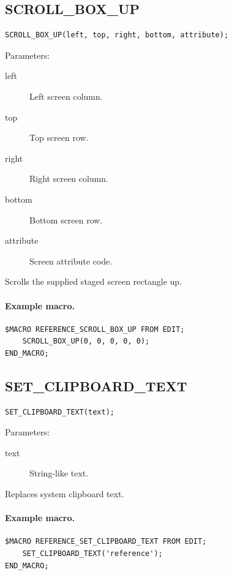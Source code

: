 \documentclass[a4paper,10pt,twoside,openany]{book}
\newenvironment{mrmacextension}{\begin{changebar}}{\end{changebar}}
\begin{document}
\label{prim:procedure-scroll-box-up}
\subsection*{SCROLL\_BOX\_UP}
\begin{verbatim}
SCROLL_BOX_UP(left, top, right, bottom, attribute);
\end{verbatim}
Parameters:
\begin{description}
\item[left] Left screen column.
\item[top] Top screen row.
\item[right] Right screen column.
\item[bottom] Bottom screen row.
\item[attribute] Screen attribute code.
\end{description}

Scrolls the supplied staged screen rectangle up.

\paragraph{Example macro.}
\begin{verbatim}
$MACRO REFERENCE_SCROLL_BOX_UP FROM EDIT;
    SCROLL_BOX_UP(0, 0, 0, 0, 0);
END_MACRO;
\end{verbatim}

\begin{mrmacextension}
\label{prim:procedure-set-clipboard-text}
\subsection*{SET\_CLIPBOARD\_TEXT}
\begin{verbatim}
SET_CLIPBOARD_TEXT(text);
\end{verbatim}
Parameters:
\begin{description}
\item[text] String-like text.
\end{description}

Replaces system clipboard text.

\paragraph{Example macro.}
\begin{verbatim}
$MACRO REFERENCE_SET_CLIPBOARD_TEXT FROM EDIT;
    SET_CLIPBOARD_TEXT('reference');
END_MACRO;
\end{verbatim}
\end{mrmacextension}
\end{document}
